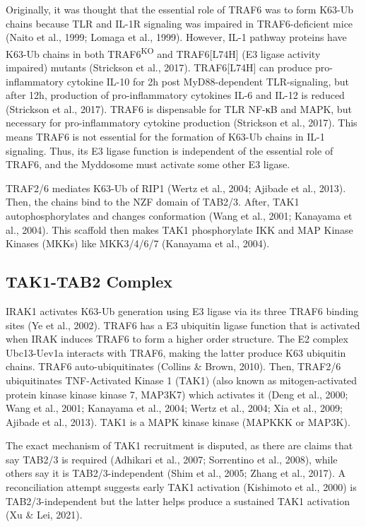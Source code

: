Originally, it was thought that the essential role of TRAF6 was to form K63-Ub chains because TLR and IL-1R signaling was impaired in TRAF6-deficient mice (Naito et al., 1999; Lomaga et al., 1999). However, IL-1 pathway proteins have K63-Ub chains in both TRAF6\textsuperscript{KO} and TRAF6[L74H] (E3 ligase activity impaired) mutants (Strickson et al., 2017). TRAF6[L74H] can produce pro-inflammatory cytokine IL-10 for 2h post MyD88-dependent TLR-signaling, but after 12h, production of pro-inflammatory cytokines IL-6 and IL-12 is reduced (Strickson et al., 2017). TRAF6 is dispensable for TLR NF-κB and MAPK, but necessary for pro-inflammatory cytokine production (Strickson et al., 2017). This means TRAF6 is not essential for the formation of K63-Ub chains in IL-1 signaling. Thus, its E3 ligase function is independent of the essential role of TRAF6, and the Myddosome must activate some other E3 ligase.

TRAF2/6 mediates K63-Ub of RIP1 (Wertz et al., 2004; Ajibade et al., 2013). Then, the chains bind to the NZF domain of TAB2/3. After, TAK1 autophosphorylates and changes conformation (Wang et al., 2001; Kanayama et al., 2004). This scaffold then makes TAK1 phosphorylate IKK{\textbeta} and MAP Kinase Kinases (MKKs) like MKK3/4/6/7 (Kanayama et al., 2004).

\subsection{TAK1-TAB2 Complex}
\label{subsection:TAK1}
IRAK1 activates K63-Ub generation using E3 ligase via its three TRAF6 binding sites (Ye et al., 2002). TRAF6 has a E3 ubiquitin ligase function that is activated when IRAK induces TRAF6 to form a higher order structure. The E2 complex Ubc13-Uev1a interacts with TRAF6, making the latter produce K63 ubiquitin chains. TRAF6 auto-ubiquitinates (Collins \& Brown, 2010). Then, TRAF2/6 ubiquitinates TNF-Activated Kinase 1 (TAK1) (also known as mitogen-activated protein kinase kinase kinase 7, MAP3K7) which activates it (Deng et al., 2000; Wang et al., 2001; Kanayama et al., 2004; Wertz et al., 2004; Xia et al., 2009; Ajibade et al., 2013). TAK1 is a MAPK kinase kinase (MAPKKK or MAP3K).

The exact mechanism of TAK1 recruitment is disputed, as there are claims that say TAB2/3 is required (Adhikari et al., 2007; Sorrentino et al., 2008), while others say it is TAB2/3-independent (Shim et al., 2005; Zhang et al., 2017). A reconciliation attempt suggests early TAK1 activation (Kishimoto et al., 2000) is TAB2/3-independent but the latter helps produce a sustained TAK1 activation (Xu \& Lei, 2021).

